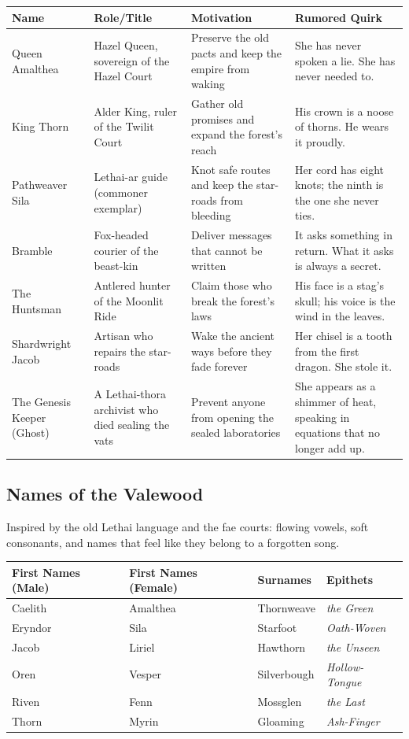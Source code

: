 \begin{longtable}{|p{}|p{}|p{}|p{}|}
\hline
\textbf{Name} & \textbf{Role/Title} & \textbf{Motivation} & \textbf{Rumored Quirk} \\
\hline
Queen Amalthea & Hazel Queen, sovereign of the Hazel Court & Preserve the old pacts and keep the empire from waking & She has never spoken a lie. She has never needed to. \\
\hline
King Thorn & Alder King, ruler of the Twilit Court & Gather old promises and expand the forest's reach & His crown is a noose of thorns. He wears it proudly. \\
\hline
Pathweaver Sila & Lethai-ar guide (commoner exemplar) & Knot safe routes and keep the star-roads from bleeding & Her cord has eight knots; the ninth is the one she never ties. \\
\hline
Bramble & Fox-headed courier of the beast-kin & Deliver messages that cannot be written & It asks something in return. What it asks is always a secret. \\
\hline
The Huntsman & Antlered hunter of the Moonlit Ride & Claim those who break the forest's laws & His face is a stag's skull; his voice is the wind in the leaves. \\
\hline
Shardwright Jacob & Artisan who repairs the star-roads & Wake the ancient ways before they fade forever & Her chisel is a tooth from the first dragon. She stole it. \\
\hline
The Genesis Keeper (Ghost) & A Lethai-thora archivist who died sealing the vats & Prevent anyone from opening the sealed laboratories & She appears as a shimmer of heat, speaking in equations that no longer add up. \\
\hline
\end{longtable}

\subsection*{Names of the Valewood}
\label{sec:valewood-names}

Inspired by the old Lethai language and the fae courts: flowing vowels, soft consonants, and names that feel like they belong to a forgotten song.

\begin{longtable}{|p{}|p{}|p{}|p{}|}
\hline
\textbf{First Names (Male)} & \textbf{First Names (Female)} & \textbf{Surnames} & \textbf{Epithets} \\
\hline
Caelith & Amalthea & Thornweave & \textit{the Green} \\
\hline
Eryndor & Sila & Starfoot & \textit{Oath-Woven} \\
\hline
Jacob & Liriel & Hawthorn & \textit{the Unseen} \\
\hline
Oren & Vesper & Silverbough & \textit{Hollow-Tongue} \\
\hline
Riven & Fenn & Mossglen & \textit{the Last} \\
\hline
Thorn & Myrin & Gloaming & \textit{Ash-Finger} \\
\hline
\end{longtable}

